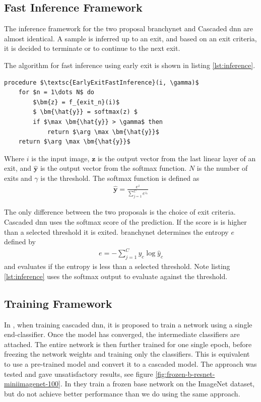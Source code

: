 \subsection{Fast Inference Framework} 

The inference framework for the two proposal \gls{branchynet} and Cascaded \gls{dnn} are almost identical. A sample is inferred up to an exit, and based on an exit criteria, it is decided to terminate or to continue to the next exit. 

The algorithm for fast inference using early exit is shown in listing \ref{lst:inference}. 

\begin{minipage}{\linewidth}
	\begin{lstlisting}[language = {}, mathescape=true, caption={Early Exit Fast Inference }, label={lst:inference}]
procedure $\textsc{EarlyExitFastInference}(i, \gamma)$
	for $n = 1\dots N$ do
		$\bm{z} = f_{exit_n}(i)$
		$ \bm{\hat{y}} = softmax(z) $
		if $\max \bm{\hat{y}} > \gamma$ then
			return $\arg \max \bm{\hat{y}}$
	return $\arg \max \bm{\hat{y}}$ 
	\end{lstlisting}
\end{minipage}

Where $ i $ is the input image, $ \bm{z} $ is the output vector from the last linear layer of an exit, and $ \bm{\hat{y}} $ is the output vector from the softmax function. $ N $ is the number of exits and $ \gamma $ is the threshold. The softmax function is defined as
\begin{align}
\bm{\hat{y}} = \frac{e^{z}}{\sum_{j=1}^{C}e^{z_c}}
\end{align}

The only difference between the two proposals is the choice of exit criteria. Cascaded \gls{dnn} uses the softmax score of the prediction. If the score is is higher than a selected threshold it is exited. \gls{branchynet} determines the entropy $ e $ defined by
\begin{align}
	e = -\sum_{j=1}^{C} y_c \log \hat{y}_c
\end{align}
and evaluates if the entropy is less than a selected threshold. Note listing \ref{lst:inference} uses the softmax output to evaluate against the threshold.

\subsection{Training Framework} 

In \cite{leroux_resource-constrained_2015}, when training cascaded \gls{dnn}, it is proposed to train a network using a single end-classifier. Once the model has converged, the intermediate classifiers are attached. The entire network is then further trained for one single epoch, before freezing the network weights and training only the classifiers. This is equivalent to use a pre-trained model and convert it to a cascaded model. The approach was tested and gave unsatisfactory results, see figure \ref{fig:frozen-b-resnet-miniimagenet-100}. In \cite{leroux_cascading_2017} they train a frozen base network on the ImageNet dataset, but do not achieve better performance than we do using the same approach.  


